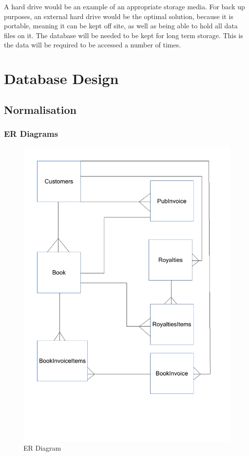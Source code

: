 A hard drive would be an example of an appropriate storage media. For back up purposes, an external hard drive would be the optimal solution, because it is portable, meaning it can be kept off site, as well as being able to hold all data files on it. The database will be needed to be kept for long term storage. This is the data will be required to be accessed a number of times.

\section{Database Design}

\subsection{Normalisation}
 
\subsubsection{ER Diagrams}


\begin{figure}[H]
    \caption{ER Diagram} \label{ER_Diagram.pdf}
    \includegraphics[width=\textwidth]{./Design/ER_Diagram.pdf}
\end{figure}


